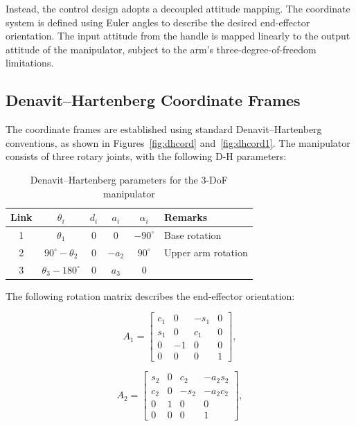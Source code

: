 Instead, the control design adopts a decoupled attitude mapping. The coordinate system is defined using Euler angles to describe the desired end-effector orientation. The input attitude from the handle is mapped linearly to the output attitude of the manipulator, subject to the arm's three-degree-of-freedom limitations.


\subsection{Denavit–Hartenberg Coordinate Frames}
The coordinate frames are established using standard Denavit–Hartenberg conventions, as shown in Figures~\ref{fig:dhcord} and~\ref{fig:dhcord1}. The manipulator consists of three rotary joints, with the following D-H parameters:

\begin{table}[htbp]
    \centering
    \caption{Denavit–Hartenberg parameters for the 3-DoF manipulator}
    \label{tab:dhparams}
    \begin{tabular}{c c c c c l}
        \toprule
        Link & $\theta_i$ & $d_i$ & $a_i$ & $\alpha_i$ & Remarks \\
        \midrule
        1 & \(\theta_1\) & 0 & 0 & \(-90^\circ\) & Base rotation \\
        2 & \(90^\circ - \theta_2\) & 0 & \(-a_2\) & \(90^\circ\) & Upper arm rotation \\
        3 & \(\theta_3 - 180^\circ\) & 0 & \(a_3\) & 0 &  \\
        \bottomrule
    \end{tabular}
\end{table}

The following rotation matrix describes the end-effector orientation:

\[
A_1 =
\begin{bmatrix}
c_1 & 0 & -s_1 & 0 \\
s_1 & 0 & c_1 & 0 \\
0 & -1 & 0 & 0 \\
0 & 0 & 0 & 1
\end{bmatrix},
\]

\[
A_2 =
\begin{bmatrix}
s_2 & 0 & c_2 & -a_2 s_2 \\
c_2 & 0 & -s_2 & -a_2 c_2 \\
0 & 1 & 0 & 0 \\
0 & 0 & 0 & 1
\end{bmatrix},
\]

